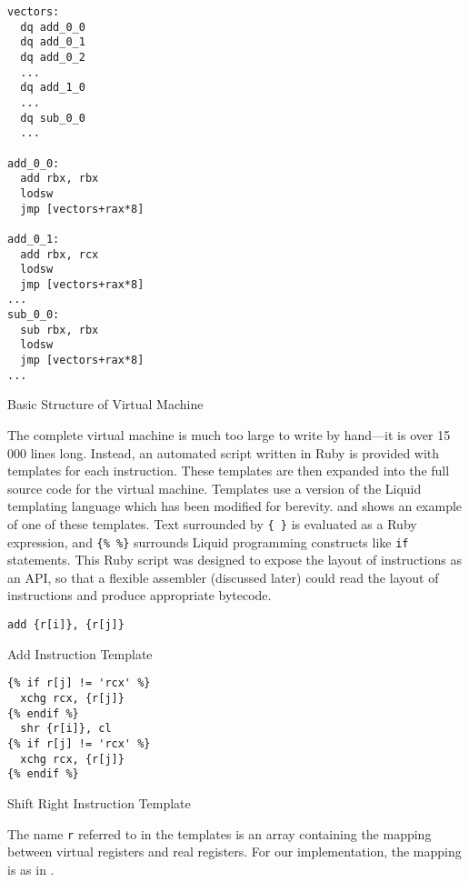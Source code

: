 		\begin{myfigure}
			\begin{lstlisting}
vectors:
  dq add_0_0
  dq add_0_1
  dq add_0_2
  ...
  dq add_1_0
  ...
  dq sub_0_0
  ...

add_0_0:
  add rbx, rbx
  lodsw
  jmp [vectors+rax*8]

add_0_1:
  add rbx, rcx
  lodsw
  jmp [vectors+rax*8]
...
sub_0_0:
  sub rbx, rbx
  lodsw
  jmp [vectors+rax*8]
...
			\end{lstlisting}
			\caption{Basic Structure of Virtual Machine}
			\label{fig:vmstructure}
		\end{myfigure}
		
		The complete virtual machine is much too large to write by hand---it is over 15 000 lines long. Instead, an automated script written in Ruby is provided with templates for each instruction. These templates are then expanded into the full source code for the virtual machine. Templates use a version of the Liquid templating language which has been modified for berevity.  and  shows an example of one of these templates. Text surrounded by \texttt{\{ \}} is evaluated as a Ruby expression, and \texttt{\{\% \%\}} surrounds Liquid programming constructs like \texttt{if} statements. This Ruby script was designed to expose the layout of instructions as an API, so that a flexible assembler (discussed later) could read the layout of instructions and produce appropriate bytecode.
		
		\begin{doublefig}
			\begin{halffig}
				\begin{lstlisting}
add {r[i]}, {r[j]}
				\end{lstlisting}
				\caption{Add Instruction Template}
				\label{fig:addtemplate}
			\end{halffig}
			\begin{halffig}
				\begin{lstlisting}
{% if r[j] != 'rcx' %}
  xchg rcx, {r[j]}
{% endif %}
  shr {r[i]}, cl
{% if r[j] != 'rcx' %}
  xchg rcx, {r[j]}
{% endif %}
				\end{lstlisting}
				\caption{Shift Right Instruction Template}
				\label{fig:shrtemplate}
			\end{halffig}
		\end{doublefig}
		
		The name \texttt{r} referred to in the templates is an array containing the mapping between virtual registers and real registers. For our implementation, the mapping is as in .
		
